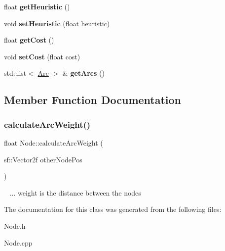 \begin{DoxyCompactItemize}
float {\bfseries get\+Heuristic} ()
\item 
\mbox{\label{class_node_a3a05e781922425fe74d2774390883d56}} 
void {\bfseries set\+Heuristic} (float heuristic)
\item 
\mbox{\label{class_node_aed7dd991e4645d166a4e3770d459039a}} 
float {\bfseries get\+Cost} ()
\item 
\mbox{\label{class_node_a9d395cc5439fc53b7d9697f44108e137}} 
void {\bfseries set\+Cost} (float cost)
\item 
\mbox{\label{class_node_ad341bb693aadd335d8990b48b2cbb1f7}} 
std\+::list$<$ \mbox{\hyperlink{class_arc}{Arc}} $>$ \& {\bfseries get\+Arcs} ()
\end{DoxyCompactItemize}


\subsection{Member Function Documentation}
\mbox{\label{class_node_a5f6014a8a8d873312eaf12303305a939}} 
\subsubsection{\texorpdfstring{calculate\+Arc\+Weight()}{calculateArcWeight()}}
{\footnotesize\ttfamily float Node\+::calculate\+Arc\+Weight (\begin{DoxyParamCaption}\item[{sf\+::\+Vector2f}]{other\+Node\+Pos }\end{DoxyParamCaption})}

~\newline
... weight is the distance between the nodes

The documentation for this class was generated from the following files\+:\begin{DoxyCompactItemize}
\item 
Node.\+h\item 
Node.\+cpp\end{DoxyCompactItemize}
